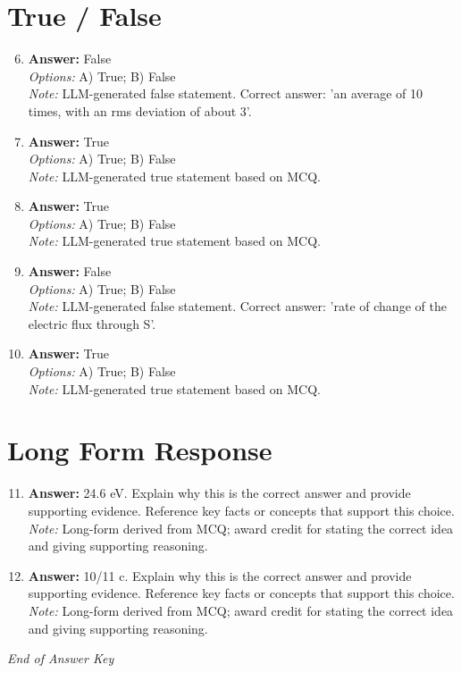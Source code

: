 \documentclass[12pt]{article}
\begin{document}
\section*{True / False}
\begin{enumerate}[label=\arabic*.]
\setcounter{enumi}{5}
\item \textbf{Answer:} False
\\ \textit{Options:} A) True; B) False
\\ \textit{Note:} LLM-generated false statement. Correct answer: 'an average of 10 times, with an rms deviation of about 3'.
\item \textbf{Answer:} True
\\ \textit{Options:} A) True; B) False
\\ \textit{Note:} LLM-generated true statement based on MCQ.
\item \textbf{Answer:} True
\\ \textit{Options:} A) True; B) False
\\ \textit{Note:} LLM-generated true statement based on MCQ.
\item \textbf{Answer:} False
\\ \textit{Options:} A) True; B) False
\\ \textit{Note:} LLM-generated false statement. Correct answer: 'rate of change of the electric flux through S'.
\item \textbf{Answer:} True
\\ \textit{Options:} A) True; B) False
\\ \textit{Note:} LLM-generated true statement based on MCQ.
\end{enumerate}

\section*{Long Form Response}
\begin{enumerate}[label=\arabic*.]
\setcounter{enumi}{10}
\item \textbf{Answer:} 24.6 eV. Explain why this is the correct answer and provide supporting evidence. Reference key facts or concepts that support this choice.
\\ \textit{Note:} Long-form derived from MCQ; award credit for stating the correct idea and giving supporting reasoning.
\item \textbf{Answer:} 10/11 c. Explain why this is the correct answer and provide supporting evidence. Reference key facts or concepts that support this choice.
\\ \textit{Note:} Long-form derived from MCQ; award credit for stating the correct idea and giving supporting reasoning.
\end{enumerate}

\vfill
\noindent\textit{End of Answer Key}
\end{document}
